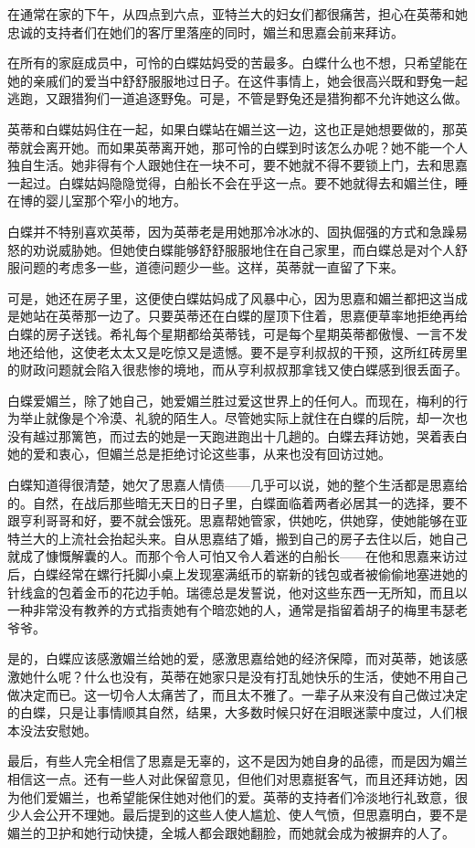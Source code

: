 \par 在通常在家的下午，从四点到六点，亚特兰大的妇女们都很痛苦，担心在英蒂和她忠诚的支持者们在她们的客厅里落座的同时，媚兰和思嘉会前来拜访。
\par 在所有的家庭成员中，可怜的白蝶姑妈受的苦最多。白蝶什么也不想，只希望能在她的亲戚们的爱当中舒舒服服地过日子。在这件事情上，她会很高兴既和野兔一起逃跑，又跟猎狗们一道追逐野兔。可是，不管是野兔还是猎狗都不允许她这么做。
\par 英蒂和白蝶姑妈住在一起，如果白蝶站在媚兰这一边，这也正是她想要做的，那英蒂就会离开她。而如果英蒂离开她，那可怜的白蝶到时该怎么办呢？她不能一个人独自生活。她非得有个人跟她住在一块不可，要不她就不得不要锁上门，去和思嘉一起过。白蝶姑妈隐隐觉得，白船长不会在乎这一点。要不她就得去和媚兰住，睡在博的婴儿室那个窄小的地方。
\par 白蝶并不特别喜欢英蒂，因为英蒂老是用她那冷冰冰的、固执倔强的方式和急躁易怒的劝说威胁她。但她使白蝶能够舒舒服服地住在自己家里，而白蝶总是对个人舒服问题的考虑多一些，道德问题少一些。这样，英蒂就一直留了下来。
\par 可是，她还在房子里，这便使白蝶姑妈成了风暴中心，因为思嘉和媚兰都把这当成是她站在英蒂那一边了。只要英蒂还在白蝶的屋顶下住着，思嘉便草率地拒绝再给白蝶的房子送钱。希礼每个星期都给英蒂钱，可是每个星期英蒂都傲慢、一言不发地还给他，这使老太太又是吃惊又是遗憾。要不是亨利叔叔的干预，这所红砖房里的财政问题就会陷入很悲惨的境地，而从亨利叔叔那拿钱又使白蝶感到很丢面子。
\par 白蝶爱媚兰，除了她自己，她爱媚兰胜过爱这世界上的任何人。而现在，梅利的行为举止就像是个冷漠、礼貌的陌生人。尽管她实际上就住在白蝶的后院，却一次也没有越过那篱笆，而过去的她是一天跑进跑出十几趟的。白蝶去拜访她，哭着表白她的爱和衷心，但媚兰总是拒绝讨论这些事，从来也没有回访过她。
\par 白蝶知道得很清楚，她欠了思嘉人情债——几乎可以说，她的整个生活都是思嘉给的。自然，在战后那些暗无天日的日子里，白蝶面临着两者必居其一的选择，要不跟亨利哥哥和好，要不就会饿死。思嘉帮她管家，供她吃，供她穿，使她能够在亚特兰大的上流社会抬起头来。自从思嘉结了婚，搬到自己的房子去住以后，她自己就成了慷慨解囊的人。而那个令人可怕又令人着迷的白船长——在他和思嘉来访过后，白蝶经常在螺行托脚小桌上发现塞满纸币的崭新的钱包或者被偷偷地塞进她的针线盒的包着金币的花边手帕。瑞德总是发誓说，他对这些东西一无所知，而且以一种非常没有教养的方式指责她有个暗恋她的人，通常是指留着胡子的梅里韦瑟老爷爷。
\par 是的，白蝶应该感激媚兰给她的爱，感激思嘉给她的经济保障，而对英蒂，她该感激她什么呢？什么也没有，英蒂在她家只是没有打乱她快乐的生活，使她不用自己做决定而已。这一切令人太痛苦了，而且太不雅了。一辈子从来没有自己做过决定的白蝶，只是让事情顺其自然，结果，大多数时候只好在泪眼迷蒙中度过，人们根本没法安慰她。
\par 最后，有些人完全相信了思嘉是无辜的，这不是因为她自身的品德，而是因为媚兰相信这一点。还有一些人对此保留意见，但他们对思嘉挺客气，而且还拜访她，因为他们爱媚兰，也希望能保住她对他们的爱。英蒂的支持者们冷淡地行礼致意，很少人会公开不理她。最后提到的这些人使人尴尬、使人气愤，但思嘉明白，要不是媚兰的卫护和她行动快捷，全城人都会跟她翻脸，而她就会成为被摒弃的人了。

